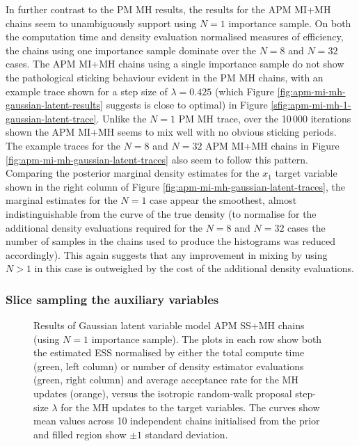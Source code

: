 In further contrast to the \ac{PM} \ac{MH} results, the results for the \ac{APM} \ac{MI}+\ac{MH} chains seem to unambiguously support using $N=1$ importance sample. On both the computation time and density evaluation normalised measures of efficiency, the chains using one importance sample dominate over the $N=8$ and $N=32$ cases. The \ac{APM} \ac{MI}+\ac{MH} chains using a single importance sample do not show the pathological sticking behaviour evident in the \ac{PM} \ac{MH} chains, with an example trace shown for a step size of $\lambda = 0.425$ (which Figure \ref{fig:apm-mi-mh-gaussian-latent-results} suggests is close to optimal) in Figure \ref{sfig:apm-mi-mh-1-gaussian-latent-trace}. Unlike the $N=1$ \ac{PM} \ac{MH} trace, over the 10\,000 iterations shown the \ac{APM} \ac{MI}+\ac{MH} seems to mix well with no obvious sticking periods. The example traces for the $N=8$ and $N=32$ \ac{APM} \ac{MI}+\ac{MH} chains in Figure \ref{fig:apm-mi-mh-gaussian-latent-traces} also seem to follow this pattern. Comparing the posterior marginal density estimates for the $x_1$ target variable shown in the right column of Figure \ref{fig:apm-mi-mh-gaussian-latent-traces}, the marginal estimates for the $N=1$ case appear the smoothest, almost indistinguishable from the curve of the true density (to normalise for the additional density evaluations required for the $N=8$ and $N=32$ cases the number of samples in the chains used to produce the histograms was reduced accordingly). This again suggests that any improvement in mixing by using $N > 1$ in this case is outweighed by the cost of the additional density evaluations.

\subsubsection{Slice sampling the auxiliary variables}

\begin{figure}
\centering
\caption[\acs{APM} \acs{SS}+\acs{MH} Gaussian model results.]{
Results of Gaussian latent variable model \acs{APM} \acs{SS}+\acs{MH} chains (using $N=1$ importance sample). The plots in each row show both the estimated \ac{ESS} normalised by either the total compute time (green, left column) or number of density estimator evaluations (green, right column) and average acceptance rate for the \ac{MH} updates (orange), versus the isotropic random-walk proposal step-size $\lambda$ for the \ac{MH} updates to the target variables. The curves show mean values across 10 independent chains initialised from the prior and filled region show $\pm 1$ standard deviation.}
\label{fig:apm-ss-mh-gaussian-latent-results}
\end{figure}

